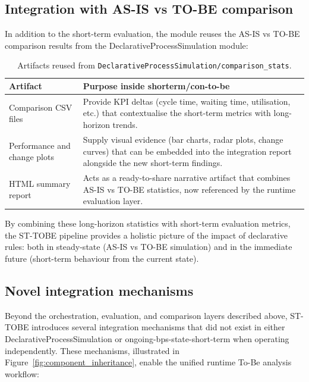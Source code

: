\documentclass[a4paper,fleqn]{cas-sc}
\begin{document}
\subsection{Integration with AS-IS vs TO-BE comparison}

In addition to the short-term evaluation, the module
reuses the AS-IS vs TO-BE comparison results from the
DeclarativeProcessSimulation module:

\begin{table}[width=.95\linewidth,cols=2,pos=t]
\caption{Artifacts reused from \texttt{DeclarativeProcessSimulation/comparison\_stats}.}
\label{tbl:comparison_artifacts}
\begin{tabular*}{\tblwidth}{@{} p{} p{} @{}}
\toprule
Artifact & Purpose inside shorterm/con-to-be \\
\midrule
Comparison CSV files & Provide KPI deltas (cycle time, waiting time, utilisation, etc.) that contextualise the short-term metrics with long-horizon trends. \\
Performance and change plots & Supply visual evidence (bar charts, radar plots, change curves) that can be embedded into the integration report alongside the new short-term findings. \\
HTML summary report & Acts as a ready-to-share narrative artifact that combines AS-IS vs TO-BE statistics, now referenced by the runtime evaluation layer. \\
\bottomrule
\end{tabular*}
\end{table}

By combining these long-horizon statistics with short-term
evaluation metrics, the ST-TOBE pipeline provides a
holistic picture of the impact of declarative rules:
both in steady-state (AS-IS vs TO-BE simulation) and in the
immediate future (short-term behaviour from the current state).

\subsection{Novel integration mechanisms}

Beyond the orchestration, evaluation, and comparison layers described above,
ST-TOBE introduces several integration mechanisms that did not exist in either
DeclarativeProcessSimulation or ongoing-bps-state-short-term when operating independently.
These mechanisms, illustrated in Figure~\ref{fig:component_inheritance}, enable the unified
runtime To-Be analysis workflow:
\end{document}

